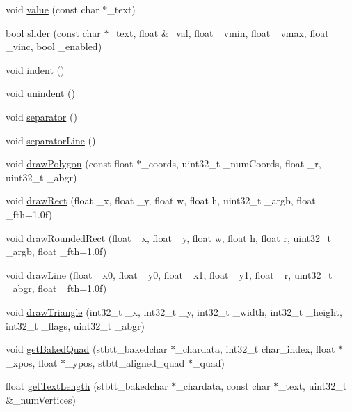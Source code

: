 \begin{DoxyCompactItemize}
\item 
void \hyperlink{struct_imgui_a0e605987e3074be8cbb1fa799384ccf0}{value} (const char $\ast$\+\_\+text)
\item 
bool \hyperlink{struct_imgui_aca17483585c81bdca548cdc85ef9c049}{slider} (const char $\ast$\+\_\+text, float \&\+\_\+val, float \+\_\+vmin, float \+\_\+vmax, float \+\_\+vinc, bool \+\_\+enabled)
\item 
void \hyperlink{struct_imgui_a0a98864c2cbb8e4afb4dc568c6b792cb}{indent} ()
\item 
void \hyperlink{struct_imgui_a9aaecd1afae09a3e2df52a1edc429b6b}{unindent} ()
\item 
void \hyperlink{struct_imgui_a590069dcfa8ac1ff9ffd000a7811ad4e}{separator} ()
\item 
void \hyperlink{struct_imgui_a3a254325e703b5b1e195d8c1099e6264}{separator\+Line} ()
\item 
void \hyperlink{struct_imgui_a6caff752aae89260ab6daa20e03f9bd9}{draw\+Polygon} (const float $\ast$\+\_\+coords, uint32\+\_\+t \+\_\+num\+Coords, float \+\_\+r, uint32\+\_\+t \+\_\+abgr)
\item 
void \hyperlink{struct_imgui_a11dae8b849f587bfc5bf08e51cf75ec3}{draw\+Rect} (float \+\_\+x, float \+\_\+y, float w, float h, uint32\+\_\+t \+\_\+argb, float \+\_\+fth=1.\+0f)
\item 
void \hyperlink{struct_imgui_a1bf59452777707efcffef0098ae41cbc}{draw\+Rounded\+Rect} (float \+\_\+x, float \+\_\+y, float w, float h, float r, uint32\+\_\+t \+\_\+argb, float \+\_\+fth=1.\+0f)
\item 
void \hyperlink{struct_imgui_a0dbccd4252f7e64c95e2a7e3b1e62114}{draw\+Line} (float \+\_\+x0, float \+\_\+y0, float \+\_\+x1, float \+\_\+y1, float \+\_\+r, uint32\+\_\+t \+\_\+abgr, float \+\_\+fth=1.\+0f)
\item 
void \hyperlink{struct_imgui_a37860630a6f7ab9f490e8820698ce08a}{draw\+Triangle} (int32\+\_\+t \+\_\+x, int32\+\_\+t \+\_\+y, int32\+\_\+t \+\_\+width, int32\+\_\+t \+\_\+height, int32\+\_\+t \+\_\+flags, uint32\+\_\+t \+\_\+abgr)
\item 
void \hyperlink{struct_imgui_a0eb9cc05c365d88c67ee39f5ca67182d}{get\+Baked\+Quad} (stbtt\+\_\+bakedchar $\ast$\+\_\+chardata, int32\+\_\+t char\+\_\+index, float $\ast$\+\_\+xpos, float $\ast$\+\_\+ypos, stbtt\+\_\+aligned\+\_\+quad $\ast$\+\_\+quad)
\item 
float \hyperlink{struct_imgui_a01f1fc7da85d8aa2882ad5024651735d}{get\+Text\+Length} (stbtt\+\_\+bakedchar $\ast$\+\_\+chardata, const char $\ast$\+\_\+text, uint32\+\_\+t \&\+\_\+num\+Vertices)

\end{DoxyCompactItemize}
